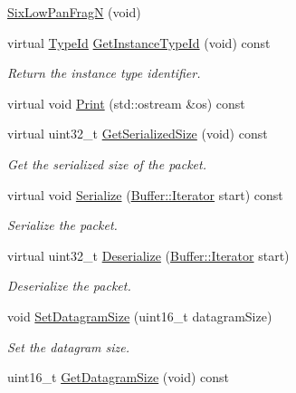 \begin{DoxyCompactItemize}
\item 
\hyperlink{classns3_1_1SixLowPanFragN_a2945c7594513f6f6767964d1301d7154}{Six\+Low\+Pan\+FragN} (void)
\item 
virtual \hyperlink{classns3_1_1TypeId}{Type\+Id} \hyperlink{classns3_1_1SixLowPanFragN_a099f763e5a83ab861417d2379d91a9ff}{Get\+Instance\+Type\+Id} (void) const 
\begin{DoxyCompactList}\small\item\em Return the instance type identifier. \end{DoxyCompactList}\item 
virtual void \hyperlink{classns3_1_1SixLowPanFragN_a33582f45478246a31b17f478e468b874}{Print} (std\+::ostream \&os) const 
\item 
virtual uint32\+\_\+t \hyperlink{classns3_1_1SixLowPanFragN_a9ad0af065517271c3892b7535b9b0066}{Get\+Serialized\+Size} (void) const 
\begin{DoxyCompactList}\small\item\em Get the serialized size of the packet. \end{DoxyCompactList}\item 
virtual void \hyperlink{classns3_1_1SixLowPanFragN_a551b56259c2cfd0234ac21f42bd2d8ca}{Serialize} (\hyperlink{classns3_1_1Buffer_1_1Iterator}{Buffer\+::\+Iterator} start) const 
\begin{DoxyCompactList}\small\item\em Serialize the packet. \end{DoxyCompactList}\item 
virtual uint32\+\_\+t \hyperlink{classns3_1_1SixLowPanFragN_a25f03bc80327eb9cc87210859c084dd3}{Deserialize} (\hyperlink{classns3_1_1Buffer_1_1Iterator}{Buffer\+::\+Iterator} start)
\begin{DoxyCompactList}\small\item\em Deserialize the packet. \end{DoxyCompactList}\item 
void \hyperlink{classns3_1_1SixLowPanFragN_a4e498eedb40e7c1b87f6086041dee54e}{Set\+Datagram\+Size} (uint16\+\_\+t datagram\+Size)
\begin{DoxyCompactList}\small\item\em Set the datagram size. \end{DoxyCompactList}\item 
uint16\+\_\+t \hyperlink{classns3_1_1SixLowPanFragN_a09a2b948441967968d5abb12722a7e33}{Get\+Datagram\+Size} (void) const 

\end{DoxyCompactItemize}
